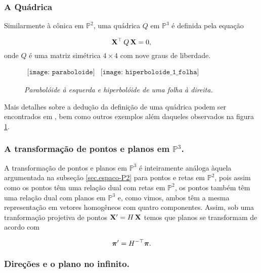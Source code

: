 \subsubsection{A Quádrica}


Similarmente à cônica em $\mathbb{P}^2$, uma quádrica $Q$ em $\mathbb{P}^3$ é definida pela equação

\begin{equation*}
\mathbf{X}^\top\,Q\,\mathbf{X} = 0,
\end{equation*}
onde $Q$ é uma matriz simétrica $4\times4$ com nove graus de liberdade.




\begin{figure}[!htb]
$
\begin{array}{cc}
\texttt{[image: paraboloide]}
&
\texttt{[image: hiperboloide\_1\_folha]}
\end{array}
$
\caption{\textit{Parabolóide à esquerda e hiperbolóide de uma folha à direita.}}
\label{quadricas}
\end{figure}


Mais detalhes sobre a dedução da definição de uma quádrica podem ser encontrados em \cite{Hartley2004}, bem como outros exemplos além daqueles observados na figura \ref{quadricas}.\\

\subsubsection{A transformação de pontos e planos em $\mathbb{P}^3$.}

A transformação de pontos e planos em $\mathbb{P}^3$ é inteiramente análoga àquela argumentada na subseção \ref{sec.espaco-P2} para pontos e retas em $\mathbb{P}^2$, pois assim como os pontos têm uma relação dual com retas em $\mathbb{P}^2$, os pontos também têm uma relação dual com planos em $\mathbb{P}^3$ e, como vimos, ambos têm a mesma representação em vetores homogêneos com quatro componentes. Assim, sob uma tranformação projetiva de pontos $\mathbf{X}'=H\,\mathbf{X}$ temos que planos se transformam de acordo com

\begin{equation*}
\boldsymbol{\pi}'=H^{-\top}\boldsymbol{\pi}.
\end{equation*}







\subsubsection{Direções e o plano no infinito.}

